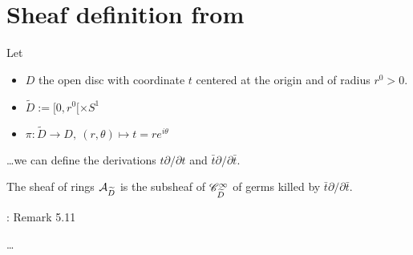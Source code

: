 \section{Sheaf definition from \cite{sabbah2007isomonodromic}}
\begin{comment}
  see \cite{sabbah2007isomonodromic} II.5.c
\end{comment}
Let
\begin{itemize}
  \item $D$ the open disc with coordinate $t$ centered at the origin and of
    radius $r^0>0$.
  \item $\tilde D:=[0,r^0[\times S^1$
  \item $\pi:\tilde D\to D,~(r,\theta)\mapsto t=re^{i\theta}$ 
\end{itemize}
\dots we can define the derivations $t\partial/\partial t$ and 
$\bar t\partial/\partial\bar t$.
\begin{defn}
  The sheaf of rings $\mathcal{A}_{\widetilde D}$ is the subsheaf of
  $\mathscr{C}_{\widetilde D}^\infty$ of germs killed by $\bar t\partial/\partial\bar t$.
\end{defn}
\begin{rem}
  \cite{sabbah2007isomonodromic}: Remark 5.11
\end{rem}
\begin{comment}
  On the sheaf $\cA_{\tilde D}$ is defined the action of the derivation
  $\partial/\partial t$\dots
\end{comment}
\dots
